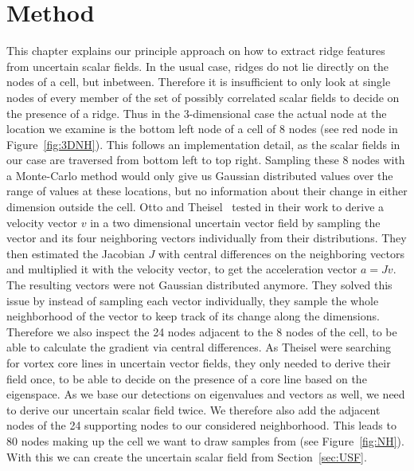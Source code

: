 \chapter{Method}\label{chap:Method}

This chapter explains our principle approach on how to extract ridge
features from uncertain scalar fields. In the usual case, ridges do not
lie directly on the nodes of a cell, but inbetween. Therefore it is
insufficient to only look at single nodes of every member of the set of
possibly correlated scalar fields to decide on the presence of a ridge.
Thus in the $3$-dimensional case the actual node at the location we
examine is the bottom left node of a cell of 8 nodes (see red node in
Figure~\ref{fig:3DNH}). This follows an implementation detail, as the
scalar fields in our case are traversed from bottom left to top right.
Sampling these 8 nodes with a Monte-Carlo method would only give us
Gaussian distributed values over the range of values at these locations,
but no information about their change in either dimension outside the
cell. Otto and Theisel~\cite{Vortex} tested in their work to derive a
velocity vector $v$ in a two dimensional uncertain vector field by
sampling the vector and its four neighboring vectors individually from
their distributions. They then estimated the Jacobian $J$ with central
differences on the neighboring vectors and multiplied it with the
velocity vector, to get the acceleration vector $a = J v$. The resulting
vectors were not Gaussian distributed anymore. They solved this issue by
instead of sampling each vector individually, they sample the whole
neighborhood of the vector to keep track of its change along the
dimensions. Therefore we also inspect the 24 nodes adjacent to the 8
nodes of the cell, to be able to calculate the gradient via central
differences. As Theisel \etal{} were searching for vortex core lines in
uncertain vector fields, they only needed to derive their field once, to
be able to decide on the presence of a core line based on the
eigenspace. As we base our detections on eigenvalues and vectors as
well, we need to derive our uncertain scalar field twice. We therefore
also add the adjacent nodes of the 24 supporting nodes to our considered
neighborhood. This leads to 80 nodes making up the cell we want to draw
samples from (see Figure~\ref{fig:NH}). With this we can create the
uncertain scalar field from Section~\ref{sec:USF}.

